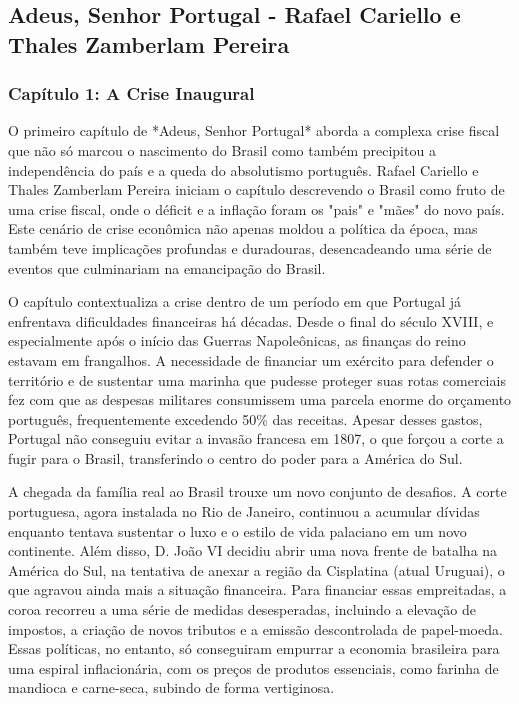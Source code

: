 \documentclass[a4paper,12pt]{article}[abntex2]
\begin{document}
\newpage
\subsection{\textbf{Adeus, Senhor Portugal - Rafael Cariello e Thales Zamberlam Pereira}}

\subsubsection{\textbf{Capítulo 1: A Crise Inaugural}}

O primeiro capítulo de *Adeus, Senhor Portugal* aborda a complexa crise fiscal que não só marcou o nascimento do Brasil como também precipitou a independência do país e a queda do absolutismo português. Rafael Cariello e Thales Zamberlam Pereira iniciam o capítulo descrevendo o Brasil como fruto de uma crise fiscal, onde o déficit e a inflação foram os "pais" e "mães" do novo país. Este cenário de crise econômica não apenas moldou a política da época, mas também teve implicações profundas e duradouras, desencadeando uma série de eventos que culminariam na emancipação do Brasil.

O capítulo contextualiza a crise dentro de um período em que Portugal já enfrentava dificuldades financeiras há décadas. Desde o final do século XVIII, e especialmente após o início das Guerras Napoleônicas, as finanças do reino estavam em frangalhos. A necessidade de financiar um exército para defender o território e de sustentar uma marinha que pudesse proteger suas rotas comerciais fez com que as despesas militares consumissem uma parcela enorme do orçamento português, frequentemente excedendo 50\% das receitas. Apesar desses gastos, Portugal não conseguiu evitar a invasão francesa em 1807, o que forçou a corte a fugir para o Brasil, transferindo o centro do poder para a América do Sul.

A chegada da família real ao Brasil trouxe um novo conjunto de desafios. A corte portuguesa, agora instalada no Rio de Janeiro, continuou a acumular dívidas enquanto tentava sustentar o luxo e o estilo de vida palaciano em um novo continente. Além disso, D. João VI decidiu abrir uma nova frente de batalha na América do Sul, na tentativa de anexar a região da Cisplatina (atual Uruguai), o que agravou ainda mais a situação financeira. Para financiar essas empreitadas, a coroa recorreu a uma série de medidas desesperadas, incluindo a elevação de impostos, a criação de novos tributos e a emissão descontrolada de papel-moeda. Essas políticas, no entanto, só conseguiram empurrar a economia brasileira para uma espiral inflacionária, com os preços de produtos essenciais, como farinha de mandioca e carne-seca, subindo de forma vertiginosa.
\end{document}
